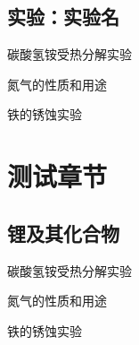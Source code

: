 \documentclass[color=orange,openany]{textbook-cn}
\begin{document}
\section{实验：实验名}
\begin{Point}
\lipsum[2]
\end{Point}

\begin{Case}
\item 碳酸氢铵受热分解实验
\item 氮气的性质和用途
\item 铁的锈蚀实验
\end{Case}


\begin{Corollary*}[推论名称]
\lipsum[2][1-7]
\end{Corollary*}



\chapter*{测试章节}
\lipsum\lipsum




\section{锂及其化合物}

\begin{Point}
\lipsum[2]
\end{Point}

\begin{Case}
\item 碳酸氢铵受热分解实验
\item 氮气的性质和用途
\item 铁的锈蚀实验
\end{Case}
\end{document}
